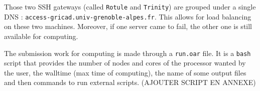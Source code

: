         Those two SSH gateways (called \verb|Rotule| and \verb|Trinity|) are grouped under a single DNS : \verb|access-gricad.univ-grenoble-alpes.fr|. This allows for load balancing on these two machines. Moreover, if one server came to fail, the other one is still available for computing. 
        
        The submission work for computing is made through a \verb|run.oar| file. It is a \verb|bash| script that provides the number of nodes and cores of the processor wanted by the user, the walltime (max time of computing), the name of some output files and then commands to run external scripts. (AJOUTER SCRIPT EN ANNEXE)